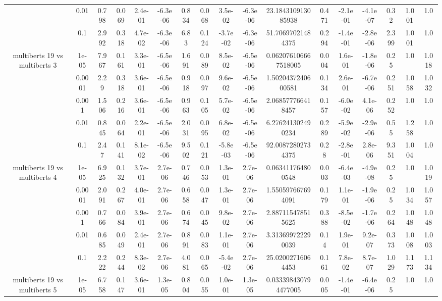 \begin{tabular}{|c|c|c|c|c|c|c|c|c|c|c|c|c|c|c|c|c|}
 & 0.01 & 0.798 & 0.069 & 2.4e-01 & -6.3e-06 & 0.834 & 0.068 & 3.5e-02 & -6.3e-06 & 23.184310913085938 & 0.471 & -2.1e-01 & -4.1e-07 & 0.32 & 1.001 & 1.0 \\
 & 0.1 & 2.992 & 0.318 & 4.7e-02 & -6.3e-06 & 6.83 & 0.124 & -3.7e-02 & -6.3e-06 & 51.70697021484375 & 0.294 & -1.4e-01 & -2.8e-06 & 2.399 & 1.001 & 1.0 \\
\hline
\multirow{5}{*}{multiberts 19 vs multiberts 3} & 1e-05 & 7.967 & 0.161 & 3.3e-01 & -6.5e-06 & 1.691 & 0.089 & 8.5e-02 & -6.5e-06 & 0.062076106667518005 & 0.004 & 1.6e-01 & -1.8e-06 & 0.25 & 1.0 & 1.018 \\
 & 0.0001 & 2.29 & 0.318 & 3.6e-01 & -6.5e-06 & 0.918 & 0.097 & 9.6e-02 & -6.5e-06 & 1.5020437240600581 & 0.134 & 2.6e-01 & -6.7e-06 & 0.251 & 1.058 & 1.032 \\
 & 0.001 & 1.506 & 0.216 & 3.6e-01 & -6.5e-06 & 0.963 & 0.105 & 5.7e-02 & -6.5e-06 & 2.068577766418457 & 0.157 & -6.0e-02 & 4.1e-06 & 0.252 & 1.0 & 1.0 \\
 & 0.01 & 0.845 & 0.064 & 2.2e-01 & -6.5e-06 & 2.031 & 0.095 & 6.8e-02 & -6.5e-06 & 6.276241302490234 & 0.289 & -5.9e-02 & -2.9e-06 & 0.55 & 1.258 & 1.0 \\
 & 0.1 & 2.47 & 0.141 & 8.1e-02 & -6.5e-06 & 9.502 & 0.121 & -5.8e-03 & -6.5e-06 & 92.00872802734375 & 0.28 & -2.8e-01 & 2.8e-06 & 9.351 & 1.004 & 1.0 \\
\hline
\multirow{5}{*}{multiberts 19 vs multiberts 4} & 1e-05 & 6.925 & 0.132 & 3.7e-01 & 2.7e-06 & 0.746 & 0.053 & 1.3e-01 & 2.7e-06 & 0.063411764800548 & 0.003 & -6.4e-03 & -4.9e-08 & 0.25 & 1.0 & 1.019 \\
 & 0.0001 & 2.091 & 0.267 & 4.0e-01 & 2.7e-06 & 0.658 & 0.047 & 1.3e-01 & 2.7e-06 & 1.550597667694091 & 0.179 & 1.1e-01 & -1.9e-06 & 0.25 & 1.034 & 1.057 \\
 & 0.001 & 0.766 & 0.084 & 3.9e-01 & 2.7e-06 & 0.674 & 0.045 & 9.8e-02 & 2.7e-06 & 2.887115478515625 & 0.388 & -8.5e-02 & -1.7e-06 & 0.264 & 1.048 & 1.048 \\
 & 0.01 & 0.685 & 0.049 & 2.4e-01 & 2.7e-06 & 0.891 & 0.083 & 1.1e-01 & 2.7e-06 & 3.313699722290039 & 0.14 & 1.9e-01 & 9.2e-07 & 0.373 & 1.008 & 1.003 \\
 & 0.1 & 2.222 & 0.244 & 8.3e-02 & 2.7e-06 & 4.081 & 0.065 & -5.4e-02 & 2.7e-06 & 25.02002716064453 & 0.161 & 7.8e-02 & 8.7e-07 & 1.029 & 1.173 & 1.134 \\
\hline
\multirow{5}{*}{multiberts 19 vs multiberts 5} & 1e-05 & 6.758 & 0.147 & 3.6e-01 & 1.3e-05 & 0.804 & 0.055 & 1.0e-01 & 1.3e-05 & 0.033398430794477005 & 0.005 & -1.4e-01 & -6.4e-06 & 0.25 & 1.0 & 1.0 \\

\end{tabular}
